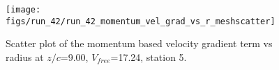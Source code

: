 \begin{figure}[H]
\centering
\texttt{[image: figs/run\_42/run\_42\_momentum\_vel\_grad\_vs\_r\_meshscatter]}
\caption{Scatter plot of the momentum based velocity gradient term vs radius at $z/c$=9.00, $V_{free}$=17.24, station 5.}
\label{fig:run_42_momentum_vel_grad_vs_r_meshscatter}
\end{figure}


